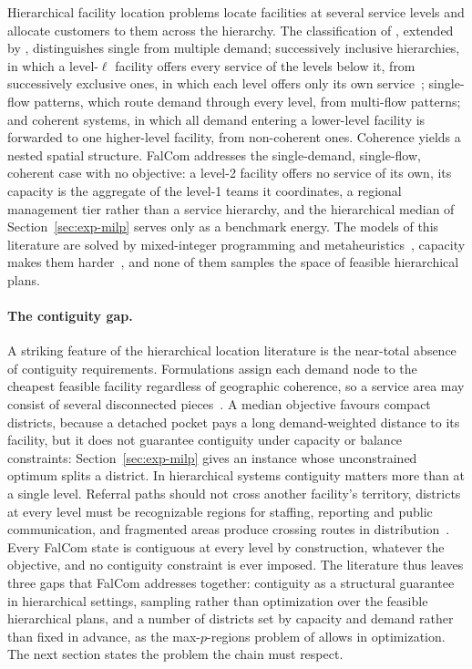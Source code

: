 \documentclass[preprint,12pt,authoryear]{elsarticle}
\theoremstyle{definition}
\begin{document}
Hierarchical facility location problems locate facilities at several service levels and allocate customers to them across the hierarchy. The classification of \citet{csahin2007review}, extended by \citet{contreras2020hierarchical}, distinguishes single from multiple demand; successively inclusive hierarchies, in which a level-$\ell$ facility offers every service of the levels below it, from successively exclusive ones, in which each level offers only its own service~\citep{NARULA198493}; single-flow patterns, which route demand through every level, from multi-flow patterns; and coherent systems, in which all demand entering a lower-level facility is forwarded to one higher-level facility, from non-coherent ones. Coherence yields a nested spatial structure. FalCom addresses the single-demand, single-flow, coherent case with no objective: a level-2 facility offers no service of its own, its capacity is the aggregate of the level-1 teams it coordinates, a regional management tier rather than a service hierarchy, and the hierarchical median of Section~\ref{sec:exp-milp} serves only as a benchmark energy. The models of this literature are solved by mixed-integer programming and metaheuristics~\citep{contreras2020hierarchical, darmian2021optimization, wang2025cluster}, capacity makes them harder~\citep{aardal1998reformulation}, and none of them samples the space of feasible hierarchical plans.

\paragraph{The contiguity gap.}
\label{sec:gaps}
A striking feature of the hierarchical location literature is the near-total absence of contiguity requirements. Formulations assign each demand node to the cheapest feasible facility regardless of geographic coherence, so a service area may consist of several disconnected pieces~\citep{contreras2020hierarchical}. A median objective favours compact districts, because a detached pocket pays a long demand-weighted distance to its facility, but it does not guarantee contiguity under capacity or balance constraints: Section~\ref{sec:exp-milp} gives an instance whose unconstrained optimum splits a district. In hierarchical systems contiguity matters more than at a single level. Referral paths should not cross another facility's territory, districts at every level must be recognizable regions for staffing, reporting and public communication, and fragmented areas produce crossing routes in distribution~\citep{MUYLDERMANS2002521}. Every FalCom state is contiguous at every level by construction, whatever the objective, and no contiguity constraint is ever imposed. The literature thus leaves three gaps that FalCom addresses together: contiguity as a structural guarantee in hierarchical settings, sampling rather than optimization over the feasible hierarchical plans, and a number of districts set by capacity and demand rather than fixed in advance, as the max-$p$-regions problem of \citet{duque2012maxp} allows in optimization. The next section states the problem the chain must respect.
\end{document}

